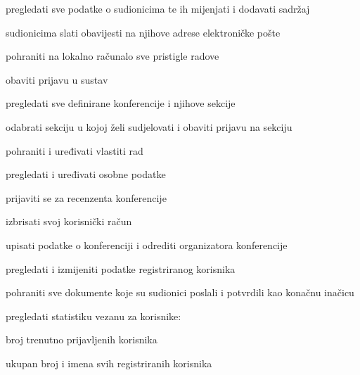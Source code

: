 	
	\begin{packed_enum}
		
			\item  {}
		\begin{packed_enum}
			
			\item pregledati sve podatke o sudionicima te ih mijenjati i dodavati sadržaj
			\item sudionicima slati obavijesti na njihove adrese elektroničke pošte
			\item pohraniti na lokalno računalo sve pristigle radove
			
		\end{packed_enum}
		
		\item  {}
		\begin{packed_enum}
			
			\item obaviti prijavu u sustav
			\item pregledati sve definirane konferencije i njihove sekcije
			\item odabrati sekciju u kojoj želi sudjelovati i obaviti prijavu na sekciju
			\item pohraniti i uređivati vlastiti rad
			\item pregledati i uređivati osobne podatke
			\item prijaviti se za recenzenta konferencije
			\item izbrisati svoj korisnički račun
			
		\end{packed_enum}
		
		\item  {}
		
		\begin{packed_enum}
			
			\item upisati podatke o konferenciji i odrediti organizatora konferencije
			\item pregledati i izmijeniti podatke registriranog korisnika
			\item pohraniti sve dokumente koje su sudionici poslali
			i potvrdili kao konačnu inačicu
			\item pregledati statistiku vezanu za korisnike:
			\begin{packed_enum}
				
				\item broj trenutno prijavljenih korisnika
				\item ukupan broj i imena svih registriranih korisnika\newline
				

\end{packed_enum}
\end{packed_enum}
\end{packed_enum}
